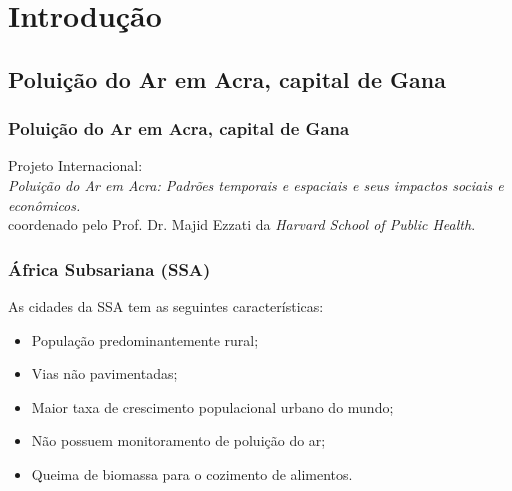 \section{Introdução}

\subsection{Poluição do Ar em Acra, capital de Gana}
\begin{frame}
  \frametitle{Poluição do Ar em Acra, capital de Gana}
  Projeto Internacional: \\
  \textit{Poluição do Ar em Acra: Padrões temporais e espaciais e seus impactos sociais e econômicos.} \\ 
  coordenado pelo Prof. Dr. Majid Ezzati da \textit{Harvard School of Public Health}.
\end{frame}

\begin{frame}
 \frametitle{ África Subsariana (SSA)}
  As cidades da SSA tem as seguintes características: 
  \begin{itemize}
    \item População predominantemente rural;
    \item Vias não pavimentadas;
    \item Maior taxa de crescimento populacional urbano do mundo;
    \item Não possuem monitoramento de poluição do ar;
    \item Queima de biomassa para o cozimento de alimentos.
  \end{itemize}
\end{frame}



